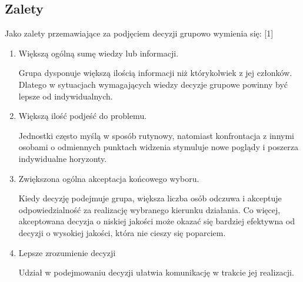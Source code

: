 \subsection{Zalety}
Jako zalety przemawiające za podjęciem decyzji grupowo wymienia się: [1]
\begin{enumerate}

  \item Większą ogólną sumę wiedzy lub informacji.
   
   Grupa dysponuje większą ilością informacji niż którykolwiek z jej członków. Dlatego w sytuacjach wymagających wiedzy decyzje grupowe powinny być lepsze od indywidualnych.
   
   \item Większą ilość podjeść do problemu.
   
   Jednostki często myślą w sposób rutynowy, natomiast konfrontacja z innymi osobami o odmiennych punktach widzenia stymuluje nowe poglądy i poszerza indywidualne horyzonty.
   
   \item Zwiększona ogólna akceptacja końcowego wyboru.
   
   Kiedy decyzję podejmuje grupa, większa liczba osób odczuwa i akceptuje odpowiedzialność za realizację wybranego kierunku działania. Co więcej, akceptowana decyzja o niskiej jakości może okazać się bardziej efektywna od decyzji o wysokiej jakości, która nie cieszy się poparciem.
   
   \item Lepsze zrozumienie decyzji
   
   Udział w podejmowaniu decyzji ułatwia komunikację w trakcie jej realizacji.

\end{enumerate}

